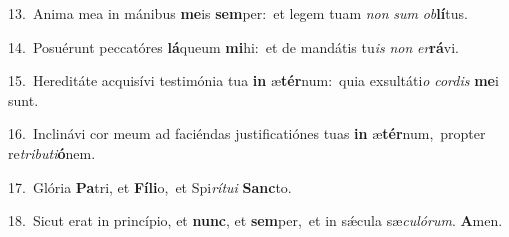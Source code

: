 {\numbfont\textcolor{\numbcolor}{13.}}~Anima mea in mánibus \textbf{me}\-is \textbf{sem}\-per:~\star et legem tuam \textit{non} \textit{sum} \textit{ob}\-\textbf{lí}tus.\par
{\numbfont\textcolor{\numbcolor}{14.}}~Posuérunt peccatóres \textbf{lá}\-queum \textbf{mi}\-hi:~\star et de mandátis tu\textit{is} \textit{non} \textit{er}\-\textbf{rá}vi.\par
{\numbfont\textcolor{\numbcolor}{15.}}~Hereditáte acquisívi testimónia tua \textbf{in} æ\-\textbf{tér}\-num:~\star quia exsultáti\textit{o} \textit{cor}\-\textit{dis} \textbf{me}\-i sunt.\par
{\numbfont\textcolor{\numbcolor}{16.}}~Inclinávi cor meum ad faciéndas justificatiónes tuas \textbf{in} æ\-\textbf{tér}\-num,~\star propter re\-\textit{tri}\-\textit{bu}\textit{ti}\textbf{ó}nem.\par
{\numbfont\textcolor{\numbcolor}{17.}}~Glória \textbf{Pa}\-tri, et \textbf{Fí}\-\textbf{li}o,~\star et Spi\-\textit{rí}\-\textit{tu}\textit{i} \textbf{Sanc}\-to.\par
{\numbfont\textcolor{\numbcolor}{18.}}~Sicut erat in princípio, et \textbf{nunc}\-, et \textbf{sem}\-per,~\star et in sǽcula sæ\-\textit{cu}\-\textit{ló}\textit{rum}. \textbf{A}\-men.\par
